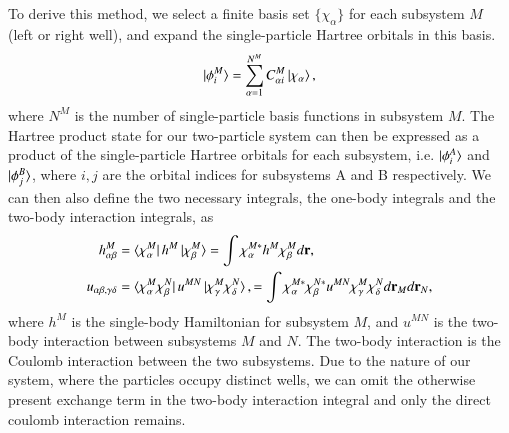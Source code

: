\documentclass{subfiles}
\begin{document}
To derive this method, we select a finite basis set $\{\chi_\alpha\}$ for each subsystem $M$ (left or right well), and expand the single-particle Hartree orbitals in this basis. 
\begin{align*}
    \ket{\phi^M_i} = \sum_{\alpha=1}^{N^M} C^M_{\alpha i}\ket{\chi_\alpha},
\end{align*}
where $N^M$ is the number of single-particle basis functions in subsystem $M$. The Hartree product state for our two-particle system can then be expressed as a product of the single-particle Hartree orbitals for each subsystem, i.e. $\ket{\phi^A_i}$ and $\ket{\phi^B_j}$, where $i,j$ are the orbital indices for subsystems A and B respectively. We can then also define the two necessary integrals, the one-body integrals and the two-body interaction integrals, as
\begin{align*}
    h_{\alpha\beta}^M &= \bra{\chi_\alpha^M}h^M\ket{\chi_\beta^M} = \int \chi_\alpha^{M*} h^M\chi_\beta^M d\mathbf{r},\\
    u_{\alpha\beta,\gamma\delta} &= \bra{\chi_\alpha^M\chi_\beta^N}u^{MN}\ket{\chi_\gamma^M\chi_\delta^N}, = \int \chi_\alpha^{M*}\chi_\beta^{N*} u^{MN} \chi_\gamma^M\chi_\delta^N d\mathbf{r}_M d\mathbf{r}_N,
\end{align*}
where $h^M$ is the single-body Hamiltonian for subsystem $M$, and $u^{MN}$ is the two-body interaction between subsystems $M$ and $N$. The two-body interaction is the Coulomb interaction between the two subsystems. Due to the nature of our system, where the particles occupy distinct wells, we can omit the otherwise present exchange term in the two-body interaction integral and only the direct coulomb interaction remains. \\
\end{document}
